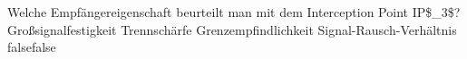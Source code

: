     {Welche Empfängereigenschaft beurteilt man mit dem Interception Point IP\$\_3\$?}
    {Großsignalfestigkeit}
    {Trennschärfe}
    {Grenzempfindlichkeit}
    {Signal-Rausch-Verhältnis}
    {false}{false}